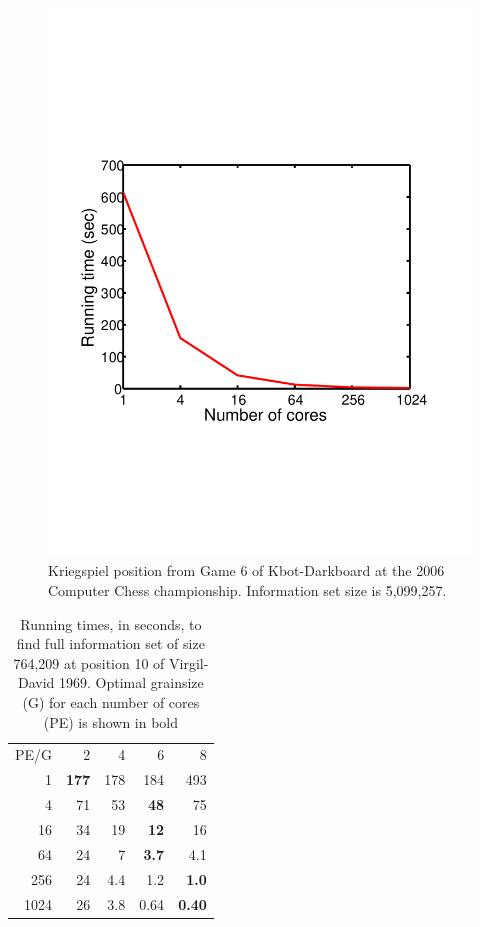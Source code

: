 \documentclass[times, 10pt,twocolumn]{article}
\begin{document}
\begin{figure}[htpb]
 \centering \includegraphics[scale=0.4]{images/KriegspielProblem5.pdf} %
\caption{Kriegspiel position from Game 6 of Kbot-Darkboard at the 2006 Computer Chess championship.  Information set size is 5,099,257.}
\label{prob5} 
\end{figure}

\begin{table}[tphb]
\centering
\begin{tabular}{rrrrr}
PE/G & 2 & 4 & 6 & 8 \\
1 & {\bf 177} & 178 & 184 & 493 \\
4 & 71 & 53 & {\bf 48} & 75 \\
16 & 34 & 19 & {\bf 12} & 16 \\
64 & 24 & 7 & {\bf 3.7} & 4.1 \\
256 & 24 & 4.4 & 1.2 & {\bf 1.0} \\
1024 & 26 & 3.8 & 0.64 & {\bf 0.40}
\end{tabular}
\caption{Running times, in seconds, to find full information set of size 764,209 at position 10 of Virgil-David 1969. Optimal grainsize (G) for each number of cores (PE) is shown in bold}
\label{tab:prob4}
\end{table}
\end{document}
